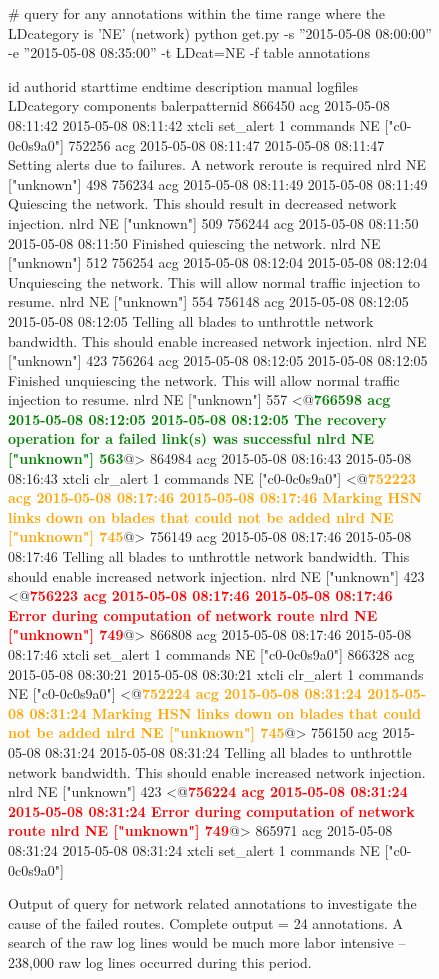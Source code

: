 \begin{figure*}
\begin{annol}
# query for any annotations within the time range where the LDcategory is 'NE' (network)
python get.py -s ''2015-05-08 08:00:00'' -e ''2015-05-08 08:35:00'' -t LDcat=NE -f table annotations

id	authorid	starttime	endtime	description	manual	logfiles	LDcategory	components	balerpatternid
866450	acg	2015-05-08 08:11:42	2015-05-08 08:11:42	xtcli set_alert	1	commands	NE	["c0-0c0s9a0"]
752256	acg	2015-05-08 08:11:47	2015-05-08 08:11:47	Setting alerts due to failures. A network reroute is required	nlrd	NE	["unknown"]	498
756234	acg	2015-05-08 08:11:49	2015-05-08 08:11:49	Quiescing the network. This should result in decreased network injection.	nlrd	NE	["unknown"]	509
756244	acg	2015-05-08 08:11:50	2015-05-08 08:11:50	Finished quiescing the network. 		nlrd	NE	["unknown"]	512
756254	acg	2015-05-08 08:12:04	2015-05-08 08:12:04	Unquiescing the network. This will allow normal traffic injection to resume.	nlrd	NE	["unknown"]	554
756148	acg	2015-05-08 08:12:05	2015-05-08 08:12:05	Telling all blades to unthrottle network bandwidth. This should enable increased network injection.	nlrd	NE	["unknown"]	423
756264	acg	2015-05-08 08:12:05	2015-05-08 08:12:05	Finished unquiescing the network. This will allow normal traffic injection to resume.	nlrd	NE	["unknown"]	557
<@\textbf{\textcolor{green}{766598	acg	2015-05-08 08:12:05	2015-05-08 08:12:05	The recovery operation for a failed link(s) was successful	nlrd	NE	["unknown"]	563}}@>
864984	acg	2015-05-08 08:16:43	2015-05-08 08:16:43	xtcli clr_alert	1	commands	NE	["c0-0c0s9a0"]
<@\textbf{\textcolor{orange}{752223	acg	2015-05-08 08:17:46	2015-05-08 08:17:46	Marking HSN links down on blades that could not be added	nlrd	NE	["unknown"]	745}}@>
756149	acg	2015-05-08 08:17:46	2015-05-08 08:17:46	Telling all blades to unthrottle network bandwidth. This should enable increased network injection.	nlrd	NE	["unknown"]	423
<@\textbf{\textcolor{red}{756223	acg	2015-05-08 08:17:46	2015-05-08 08:17:46	Error during computation of network route	nlrd	NE	["unknown"]	749}}@>
866808	acg	2015-05-08 08:17:46	2015-05-08 08:17:46	xtcli set_alert	1	commands	NE	["c0-0c0s9a0"]
866328	acg	2015-05-08 08:30:21	2015-05-08 08:30:21	xtcli clr_alert	1	commands	NE	["c0-0c0s9a0"]
<@\textbf{\textcolor{orange}{752224	acg	2015-05-08 08:31:24	2015-05-08 08:31:24	Marking HSN links down on blades that could not be added	nlrd	NE	["unknown"]	745}}@>
756150	acg	2015-05-08 08:31:24	2015-05-08 08:31:24	Telling all blades to unthrottle network bandwidth. This should enable increased network injection.	nlrd	NE	["unknown"]	423
<@\textbf{\textcolor{red}{756224	acg	2015-05-08 08:31:24	2015-05-08 08:31:24	Error during computation of network route	nlrd	NE	["unknown"]	749}}@>
865971	acg	2015-05-08 08:31:24	2015-05-08 08:31:24	xtcli set_alert	1	commands	NE	["c0-0c0s9a0"]
\end{annol}
\caption{Output of query for network related annotations to investigate the cause of the failed routes. Complete output = 24 annotations.
A search of the raw log lines would be much more labor intensive -- 238,000 raw log lines occurred during this period.}
\label{f:routNEq}
\end{figure*}

